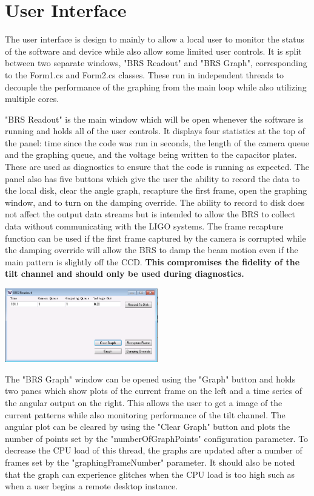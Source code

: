 \documentclass{article}
\begin{document}
\section{User Interface}

The user interface is design to mainly to allow a local user to monitor the status of the software and device while also allow some limited user controls. It is split between two separate windows, "BRS Readout" and "BRS Graph", corresponding to the Form1.cs and Form2.cs classes. These run in independent threads to decouple the performance of the graphing from the main loop while also utilizing multiple cores.

"BRS Readout" is the main window which will be open whenever the software is running and holds all of the user controls. It displays four statistics at the top of the panel: time since the code was run in seconds, the length of the camera queue and the graphing queue, and the voltage being written to the capacitor plates. These are used as diagnostics to ensure that the code is running as expected. The panel also has five buttons which give the user the ability to record the data to the local disk, clear the angle graph, recapture the first frame, open the graphing window, and to turn on the damping override. The ability to record to disk does not affect the output data streams but is intended to allow the BRS to collect data without communicating with the LIGO systems. The frame recapture function can be used if the first frame captured by the camera is corrupted while the damping override will allow the BRS to damp the beam motion even if the main pattern is slightly off the CCD. \textbf{This compromises the fidelity of the tilt channel and should only be used during diagnostics.}

\begin{center}
\includegraphics[width=0.5\textwidth]{BRSReadoutScreen.png}\\
\end{center}

The "BRS Graph" window can be opened using the "Graph" button and holds two panes which show plots of the current frame on the left and a time series of the angular output on the right. This allows the user to get a image of the current patterns while also monitoring performance of the tilt channel. The angular plot can be cleared by using the "Clear Graph" button and plots the number of points set by the "numberOfGraphPoints" configuration parameter. To decrease the CPU load of this thread, the graphs are updated after a number of frames set by the "graphingFrameNumber" parameter. It should also be noted that the graph can experience glitches when the CPU load is too high such as when a user begins a remote desktop instance.\\
\end{document}
